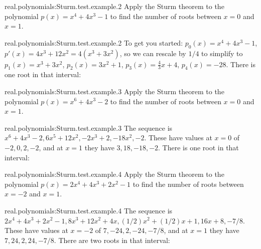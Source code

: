 \begin{problem}{real.polynomials:Sturm.test.example.2}
Apply the Sturm theorem to the polynomial \(p(x)=x^4+4x^3-1\) to find the number of roots between \(x=0\) and \(x=1\).
\end{problem}
\begin{answer}{real.polynomials:Sturm.test.example.2}
To get you started: \(p_0(x)=x^4+4x^3-1\), \(p'(x)=4x^3 + 12x^2=4(x^3+3x^2)\), so we can rescale by \(1/4\) to simplify to \(p_1(x)=x^3+3x^2\), \(p_2(x)=3x^2 + 1\), \(p_3(x)=\frac{4}{3}x + 4\), \(p_4(x)= -28\).
There is one root in that interval:
\begin{center}
\end{center}
\end{answer}
\begin{problem}{real.polynomials:Sturm.test.example.3}
Apply the Sturm theorem to the polynomial \(p(x)=x^6+4x^3-2\) to find the number of roots between \(x=0\) and \(x=1\).
\end{problem}
\begin{answer}{real.polynomials:Sturm.test.example.3}
The sequence is \(x^6+4x^3-2, 6x^5+12x^2, -2x^3+2, -18x^2, -2\). 
These have values at \(x=0\) of \(-2, 0, 2, -2\), and at \(x=1\) they have \(3, 18, -18, -2\).
There is one root in that interval:
\begin{center}
\end{center}
\end{answer}
\begin{problem}{real.polynomials:Sturm.test.example.4}
Apply the Sturm theorem to the polynomial \(p(x)=2x^4+4x^3+2x^2-1\) to find the number of roots between \(x=-2\) and \(x=1\).
\end{problem}
\begin{answer}{real.polynomials:Sturm.test.example.4}
The sequence is \(2x^4+4x^3+2x^2-1, 8x^3 + 12x^2 + 4x, (1/2)x^2+(1/2)x+1, 16x+8, -7/8\).
These have values at \(x=-2\) of \(7, -24, 2, -24, -7/8\), and at \(x=1\) they have \(7, 24, 2, 24, -7/8\).
There are two roots in that interval:
\begin{center}
\end{center}
\end{answer}

